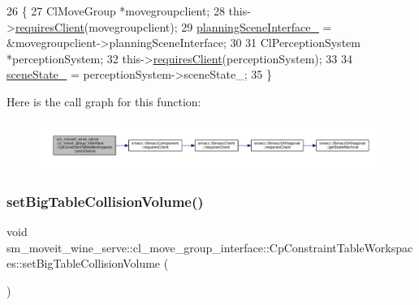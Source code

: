\begin{DoxyCode}
26         \{
27             ClMoveGroup *movegroupclient;
28             this->\hyperlink{classsmacc_1_1ISmaccComponent_a36c085d906fbae0fcaee817aaeafebf4}{requiresClient}(movegroupclient);
29             \hyperlink{classsm__moveit__wine__serve_1_1cl__move__group__interface_1_1CpConstraintTableWorkspaces_a1dd378cd9d4577e058e8d1e02550ccc7}{planningSceneInterface\_} = &movegroupclient->planningSceneInterface;
30 
31             ClPerceptionSystem *perceptionSystem;
32             this->\hyperlink{classsmacc_1_1ISmaccComponent_a36c085d906fbae0fcaee817aaeafebf4}{requiresClient}(perceptionSystem);
33 
34             \hyperlink{classsm__moveit__wine__serve_1_1cl__move__group__interface_1_1CpConstraintTableWorkspaces_aab7d48a69283768e66236eaf39c52554}{sceneState\_} = perceptionSystem->sceneState\_;
35         \}
\end{DoxyCode}
Here is the call graph for this function\+:
\nopagebreak
\begin{figure}[H]
\begin{center}
\leavevmode
\includegraphics[width=350pt]{classsm__moveit__wine__serve_1_1cl__move__group__interface_1_1CpConstraintTableWorkspaces_a7bb129fe7744909e2238ed94e61e3c30_cgraph}
\end{center}
\end{figure}
\mbox{\label{classsm__moveit__wine__serve_1_1cl__move__group__interface_1_1CpConstraintTableWorkspaces_aadce0ed924f3ea475d0bb7f892b18db9}} 
\subsubsection{\texorpdfstring{set\+Big\+Table\+Collision\+Volume()}{setBigTableCollisionVolume()}}
{\footnotesize\ttfamily void sm\+\_\+moveit\+\_\+wine\+\_\+serve\+::cl\+\_\+move\+\_\+group\+\_\+interface\+::\+Cp\+Constraint\+Table\+Workspaces\+::set\+Big\+Table\+Collision\+Volume (\begin{DoxyParamCaption}{ }\end{DoxyParamCaption})}



